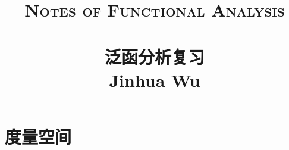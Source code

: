 
\usepackage{float}
\usepackage{enumitem}
\usepackage{amsmath}
\usepackage{amssymb}
\usepackage{hyperref}
\usepackage{cleveref}
\usepackage{annotate-equations}
\usepackage{zhlipsum}
\title{ \normalsize \textsc{Notes of Functional Analysis}
		\\ [2.0cm]
		\HRule{1.5pt} \\
		\LARGE \textbf{\uppercase{泛函分析复习}
		\HRule{2.0pt} \\ [0.6cm] \LARGE{Jinhua Wu} \vspace*{10\baselineskip}}
		}
\date{}
\author{}
\newcommand{\weak}{\rightharpoonup}

	\maketitle
	\tableofcontents 
	\newpage
	\setcounter{page}{1}
	\chapter{度量空间}
